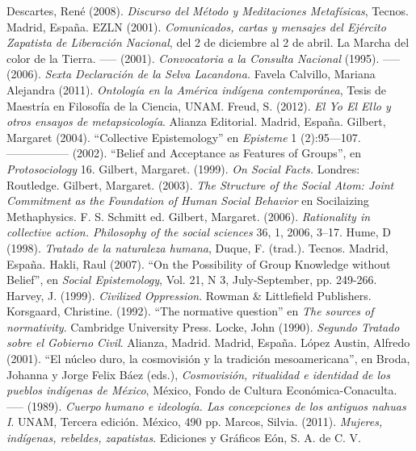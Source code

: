 \documentclass[oneside]{book}
\begin{document}
\begin{thebibliography}{99}
     Descartes, René (2008). \textit{Discurso del Método y Meditaciones Metafísicas}, Tecnos. Madrid, España.
     EZLN (2001). \textit{Comunicados, cartas y mensajes del Ejército Zapatista de Liberación Nacional}, del 2 de diciembre al 2 de abril. La Marcha del color de la Tierra.
     ----- (2001). \textit{Convocatoria a la Consulta Nacional} (1995).
     ----- (2006). \textit{Sexta Declaración de la Selva Lacandona.}
 Favela Calvillo, Mariana Alejandra (2011). \textit{Ontología en la América indígena contemporánea}, Tesis de Maestría en Filosofía de la Ciencia,  UNAM.
 Freud, S. (2012). \textit{El Yo El Ello y otros ensayos de metapsicología}. Alianza Editorial. Madrid, España.
 Gilbert, Margaret (2004). “Collective Epistemology” en \textit{Episteme} 1 (2):95—107.
 ----------------- (2002). “Belief and Acceptance as Features of Groups”, en \textit{Protosociology} 16.   
 Gilbert, Margaret. (1999). \textit{On Social Facts.} Londres: Routledge.
 Gilbert, Margaret. (2003). \textit{The Structure of the Social Atom: Joint Commitment as the Foundation of Human Social Behavior} en Socilaizing Methaphysics. F. S. Schmitt ed.
Gilbert, Margaret. (2006). \textit{Rationality in collective action. Philosophy of the social sciences} 36, 1, 2006, 3–17.
 Hume, D (1998). \textit{Tratado de la naturaleza humana}, Duque, F. (trad.). Tecnos. Madrid, España.
 Hakli, Raul (2007). “On the Possibility of Group Knowledge without Belief”, en \textit{Social Epistemology}, Vol. 21, N 3, July-September, pp. 249-266.  
 Harvey, J. (1999). \textit{Civilized Oppression}. Rowman \& Littlefield Publishers.
 Korsgaard, Christine. (1992). “The normative question” en \textit{The sources of normativity}. Cambridge University Press.
 Locke, John (1990). \textit{Segundo Tratado sobre el Gobierno Civil}. Alianza, Madrid. Madrid, España.
 López Austin, Alfredo (2001). “El núcleo duro, la cosmovisión y la tradición mesoamericana”, en Broda, Johanna y Jorge Felix Báez (eds.), \textit{Cosmovisión, ritualidad e identidad de los pueblos indígenas de México}, México, Fondo de Cultura Económica-Conaculta.
----- (1989). \textit{Cuerpo humano e ideología. Las concepciones de los antiguos nahuas I}. UNAM, Tercera edición. México, 490 pp.
 Marcos, Silvia. (2011). \textit{Mujeres, indígenas, rebeldes, zapatistas}. Ediciones y Gráficos Eón, S. A. de C. V.

\end{thebibliography}
\end{document}
